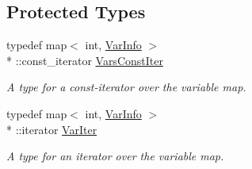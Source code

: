 \subsection*{Protected Types}
\begin{DoxyCompactItemize}
\item 
typedef map$<$ int, \hyperlink{classVarInfo}{Var\-Info} $>$\\*
\-::const\-\_\-iterator \hyperlink{classVarManager_a93880917008b13ac5ce12b40312d3f4b}{Vars\-Const\-Iter}
\begin{DoxyCompactList}\small\item\em A type for a const-\/iterator over the variable map. \end{DoxyCompactList}\item 
typedef map$<$ int, \hyperlink{classVarInfo}{Var\-Info} $>$\\*
\-::iterator \hyperlink{classVarManager_a822fe2321e2d48725e4d9e63ab22843f}{Var\-Iter}
\begin{DoxyCompactList}\small\item\em A type for an iterator over the variable map. \end{DoxyCompactList}\end{DoxyCompactItemize}
